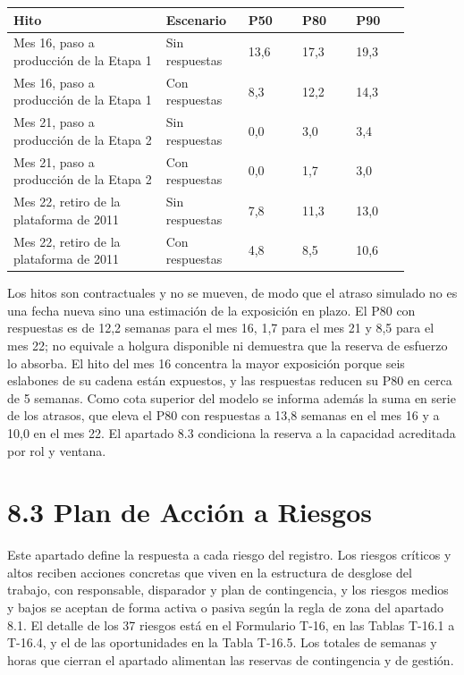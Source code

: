 \documentclass[11pt]{article}
\begin{document}
\begin{longtable}{p{0.34\linewidth}p{0.18\linewidth}p{0.12\linewidth}p{0.12\linewidth}p{0.12\linewidth}}
\toprule
\textbf{Hito} & \textbf{Escenario} & \textbf{P50} & \textbf{P80} & \textbf{P90} \\
\midrule
\endhead
\bottomrule
\endlastfoot
Mes 16, paso a producción de la Etapa 1 & Sin respuestas & 13,6 & 17,3 & 19,3 \\
Mes 16, paso a producción de la Etapa 1 & Con respuestas & 8,3 & 12,2 & 14,3 \\
Mes 21, paso a producción de la Etapa 2 & Sin respuestas & 0,0 & 3,0 & 3,4 \\
Mes 21, paso a producción de la Etapa 2 & Con respuestas & 0,0 & 1,7 & 3,0 \\
Mes 22, retiro de la plataforma de 2011 & Sin respuestas & 7,8 & 11,3 & 13,0 \\
Mes 22, retiro de la plataforma de 2011 & Con respuestas & 4,8 & 8,5 & 10,6 \\
\end{longtable}

Los hitos son contractuales y no se mueven, de modo que el atraso simulado no es una fecha nueva sino una estimación de la exposición en plazo. El P80 con respuestas es de 12,2 semanas para el mes 16, 1,7 para el mes 21 y 8,5 para el mes 22; no equivale a holgura disponible ni demuestra que la reserva de esfuerzo lo absorba. El hito del mes 16 concentra la mayor exposición porque seis eslabones de su cadena están expuestos, y las respuestas reducen su P80 en cerca de 5 semanas. Como cota superior del modelo se informa además la suma en serie de los atrasos, que eleva el P80 con respuestas a 13,8 semanas en el mes 16 y a 10,0 en el mes 22. El apartado 8.3 condiciona la reserva a la capacidad acreditada por rol y ventana.

\section{8.3 Plan de Acción a Riesgos}\label{plan-de-acciuxf3n-a-riesgos}

Este apartado define la respuesta a cada riesgo del registro. Los riesgos críticos y altos reciben acciones concretas que viven en la estructura de desglose del trabajo, con responsable, disparador y plan de contingencia, y los riesgos medios y bajos se aceptan de forma activa o pasiva según la regla de zona del apartado 8.1. El detalle de los 37 riesgos está en el Formulario T-16, en las Tablas T-16.1 a T-16.4, y el de las oportunidades en la Tabla T-16.5. Los totales de semanas y horas que cierran el apartado alimentan las reservas de contingencia y de gestión.
\end{document}
